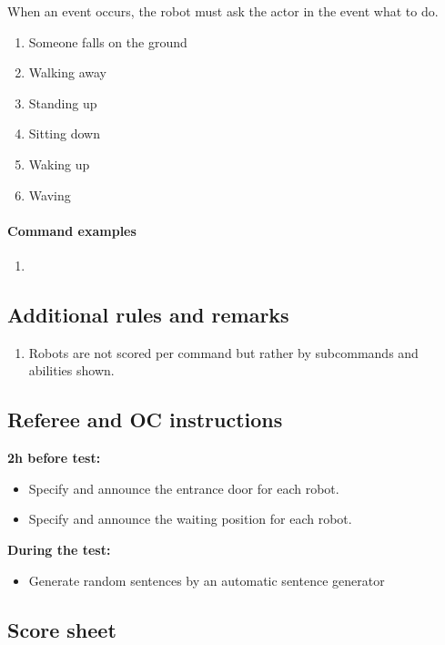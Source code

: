 When an event occurs, the robot must ask the actor in the event what to do. 
\begin{enumerate}
 \item Someone falls on the ground
 \item Walking away
 \item Standing up
 \item Sitting down
 \item Waking up
 \item Waving
\end{enumerate}


\paragraph{Command examples}
\begin{enumerate}
 \item
\end{enumerate}

\subsection{Additional rules and remarks}
\label{sec:eegpsr_remarks}
\begin{enumerate}
  \item Robots are not scored per command but rather by subcommands and abilities shown. 
\end{enumerate}

\subsection{Referee and OC instructions}
\textbf{2h before test:}
\begin{itemize}
\item Specify and announce the entrance door for each robot. 
\item Specify and announce the waiting position for each robot. 
\end{itemize}
\textbf{During the test:}
\begin{itemize}
\item Generate random sentences by an automatic sentence generator
\end{itemize}

\newpage
\subsection{Score sheet}


 
